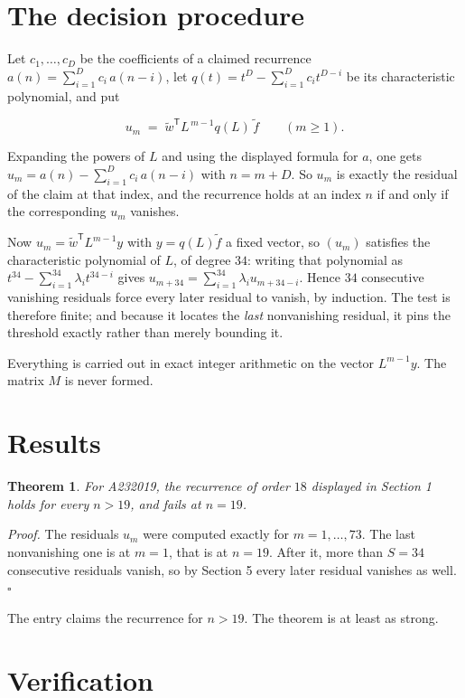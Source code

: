\documentclass[11pt]{article}
\newtheorem{theorem}{Theorem}
\theoremstyle{definition}
\begin{document}
\section{The decision procedure}

Let $c_1,\dots,c_D$ be the coefficients of a claimed recurrence $a(n) = \sum_{i=1}^{D} c_i\,a(n-i)$, let $q(t) = t^{D} - \sum_{i=1}^{D} c_i t^{D-i}$ be its characteristic polynomial, and put

\[u_m \;=\; \tilde w^{\mathsf T} L^{\,m-1} q(L)\,\tilde f \qquad (m \ge 1).\]

Expanding the powers of $L$ and using the displayed formula for $a$, one gets $u_m = a(n) - \sum_{i=1}^{D} c_i\,a(n-i)$ with $n = m + D$. So $u_m$ is exactly the residual of the claim at that index, and the recurrence holds at an index $n$ if and only if the corresponding $u_m$ vanishes.

Now $u_m = \tilde w^{\mathsf T} L^{m-1} y$ with $y = q(L)\tilde f$ a fixed vector, so $(u_m)$ satisfies the characteristic polynomial of $L$, of degree $34$: writing that polynomial as $t^{34} - \sum_{i=1}^{34} \lambda_i t^{34-i}$ gives $u_{m+34} = \sum_{i=1}^{34} \lambda_i u_{m+34-i}$. Hence $34$ consecutive vanishing residuals force every later residual to vanish, by induction. The test is therefore finite; and because it locates the {\itshape last} nonvanishing residual, it pins the threshold exactly rather than merely bounding it.

Everything is carried out in exact integer arithmetic on the vector $L^{m-1}y$. The matrix $M$ is never formed.

\section{Results}

\begin{theorem} For A232019, the recurrence of order $18$ displayed in Section 1 holds for every $n > 19$, and fails at $n = 19$.\end{theorem}

{\itshape Proof.} The residuals $u_m$ were computed exactly for $m = 1,\dots,73$. The last nonvanishing one is at $m = 1$, that is at $n = 19$. After it, more than $S = 34$ consecutive residuals vanish, so by Section 5 every later residual vanishes as well. $\square$

The entry claims the recurrence for $n > 19$. The theorem is at least as strong.

\section{Verification}
\end{document}
